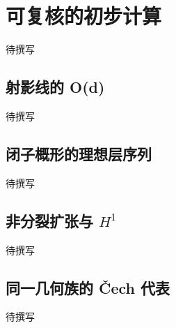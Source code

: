 
% 
% 
% 

\section{可复核的初步计算}
\label{g5:sec:1805}

待撰写

\subsection{射影线的 O(d)}
\label{g5:subsec:1805:01}
待撰写

\subsection{闭子概形的理想层序列}
\label{g5:subsec:1805:02}
待撰写

\subsection{\texorpdfstring{非分裂扩张与 \(H^1\)}{非分裂扩张与 H¹}}
\label{g5:subsec:1805:03}
待撰写

\subsection{同一几何族的 Čech 代表}
\label{g5:subsec:1805:04}
待撰写
